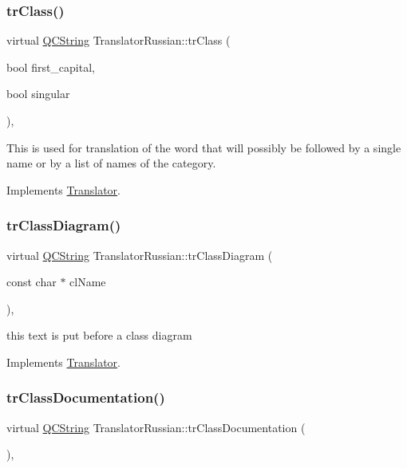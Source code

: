 \subsubsection{\texorpdfstring{trClass()}{trClass()}}
{\footnotesize\ttfamily virtual \mbox{\hyperlink{class_q_c_string}{Q\+C\+String}} Translator\+Russian\+::tr\+Class (\begin{DoxyParamCaption}\item[{bool}]{first\+\_\+capital,  }\item[{bool}]{singular }\end{DoxyParamCaption})\hspace{0.3cm}{\ttfamily [inline]}, {\ttfamily [virtual]}}

This is used for translation of the word that will possibly be followed by a single name or by a list of names of the category. 

Implements \mbox{\hyperlink{class_translator}{Translator}}.

\mbox{\label{class_translator_russian_a55c5f49ca4ffa6edc7d40c4ae2d76968}} 
\subsubsection{\texorpdfstring{trClassDiagram()}{trClassDiagram()}}
{\footnotesize\ttfamily virtual \mbox{\hyperlink{class_q_c_string}{Q\+C\+String}} Translator\+Russian\+::tr\+Class\+Diagram (\begin{DoxyParamCaption}\item[{const char $\ast$}]{cl\+Name }\end{DoxyParamCaption})\hspace{0.3cm}{\ttfamily [inline]}, {\ttfamily [virtual]}}

this text is put before a class diagram 

Implements \mbox{\hyperlink{class_translator}{Translator}}.

\mbox{\label{class_translator_russian_a2d08e80dcf6b3bf61f61598f130364e4}} 
\subsubsection{\texorpdfstring{trClassDocumentation()}{trClassDocumentation()}}
{\footnotesize\ttfamily virtual \mbox{\hyperlink{class_q_c_string}{Q\+C\+String}} Translator\+Russian\+::tr\+Class\+Documentation (\begin{DoxyParamCaption}{ }\end{DoxyParamCaption})\hspace{0.3cm}{\ttfamily [inline]}, {\ttfamily [virtual]}}

